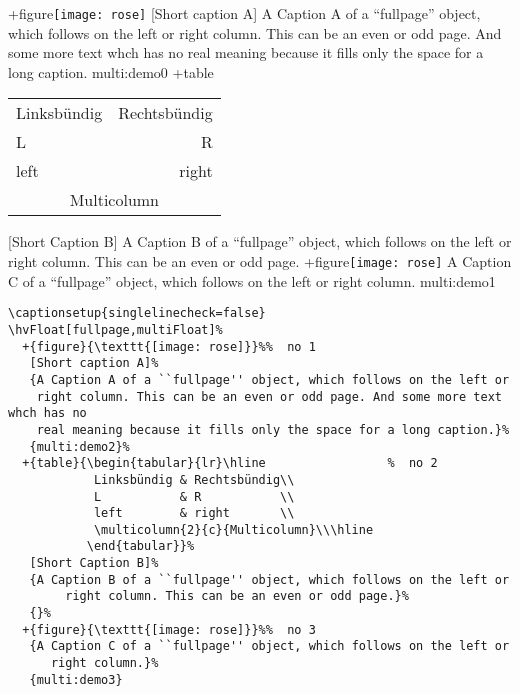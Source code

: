 \documentclass[twoside,twocolumn]{scrartcl}
\begin{document}
\captionsetup{singlelinecheck=false}
%
  +{figure}{\texttt{[image: rose]}}%
   [Short caption A]%
   {A Caption A of a ``fullpage'' object, which follows on the left or
    right column. This can be an even or odd page. And some more text whch has no
    real meaning because it fills only the space for a long caption.}%
   {multi:demo0}%
  +{table}{\begin{tabular}{lr}\hline                 %
            Linksbündig & Rechtsbündig\\
            L           & R           \\
            left        & right       \\
            \multicolumn{2}{c}{Multicolumn}\\\hline
           \end{tabular}}%
   [Short Caption B]%
   {A Caption B of a ``fullpage'' object, which follows on the left or
        right column. This can be an even or odd page.}{}%
  +{figure}{\texttt{[image: rose]}}%
   {A Caption C of a ``fullpage'' object, which follows on the left or
      right column.}%
   {multi:demo1}




\blinddocument



\begin{lstlisting}
\captionsetup{singlelinecheck=false}
\hvFloat[fullpage,multiFloat]%
  +{figure}{\texttt{[image: rose]}}%%  no 1
   [Short caption A]%
   {A Caption A of a ``fullpage'' object, which follows on the left or
    right column. This can be an even or odd page. And some more text whch has no
    real meaning because it fills only the space for a long caption.}%
   {multi:demo2}%
  +{table}{\begin{tabular}{lr}\hline                 %  no 2
            Linksbündig & Rechtsbündig\\
            L           & R           \\
            left        & right       \\
            \multicolumn{2}{c}{Multicolumn}\\\hline
           \end{tabular}}%
   [Short Caption B]%
   {A Caption B of a ``fullpage'' object, which follows on the left or
        right column. This can be an even or odd page.}%
   {}%
  +{figure}{\texttt{[image: rose]}}%%  no 3
   {A Caption C of a ``fullpage'' object, which follows on the left or
      right column.}%
   {multi:demo3}
\end{lstlisting}
\end{document}

